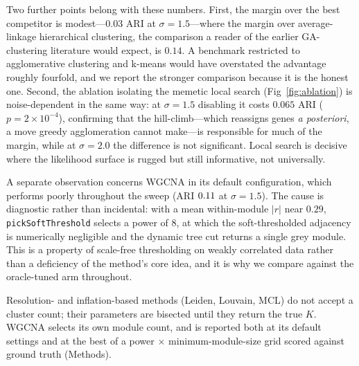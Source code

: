 Two further points belong with these numbers. First, the margin over the best
competitor is modest---$0.03$ ARI at $\sigma=1.5$---where the margin over
average-linkage hierarchical clustering, the comparison a reader of the earlier
GA-clustering literature would expect, is $0.14$. A benchmark restricted to
agglomerative clustering and k-means would have overstated the advantage roughly
fourfold, and we report the stronger comparison because it is the honest one.
Second, the ablation isolating the memetic local search (Fig~\ref{fig:ablation}) is noise-dependent in the
same way: at $\sigma=1.5$ disabling it costs $0.065$ ARI ($p=2\times10^{-4}$),
confirming that the hill-climb---which reassigns genes \emph{a posteriori}, a move
greedy agglomeration cannot make---is responsible for much of the margin, while at
$\sigma=2.0$ the difference is not significant. Local search is decisive where the
likelihood surface is rugged but still informative, not universally.

A separate observation concerns WGCNA in its default configuration, which
performs poorly throughout the sweep (ARI $0.11{}$ at $\sigma=1.5$).
The cause is diagnostic rather than incidental: with a mean within-module
$\lvert r\rvert$ near $0.29$, \texttt{pickSoftThreshold} selects a power of $8$,
at which the soft-thresholded adjacency is numerically negligible and the dynamic
tree cut returns a single grey module. This is a property of scale-free
thresholding on weakly correlated data rather than a deficiency of the method's
core idea, and it is why we compare against the oracle-tuned arm throughout.

\begin{table}[!ht]
\centering
\caption{\textbf{Module recovery against contemporary module detectors}
(ARI, mean $\pm$ SD over \NSeeds{} datasets) on the five-module design across a
noise sweep, with the number of clusters fixed to the truth or bisected to it.}
\label{tab:baselines}
\begin{adjustwidth}{-1.25in}{0in}
\centering
{}
\end{adjustwidth}
\begin{flushleft}
Resolution- and inflation-based methods (Leiden, Louvain, MCL) do not accept a
cluster count; their parameters are bisected until they return the true $K$.
WGCNA selects its own module count, and is reported both at its default settings
and at the best of a power $\times$ minimum-module-size grid scored against
ground truth (Methods).
\end{flushleft}
\end{table}

